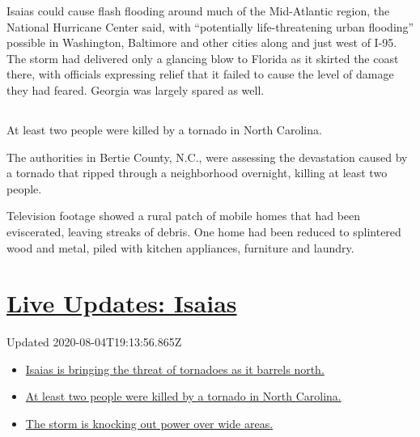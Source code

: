 Isaias could cause flash flooding around much of the Mid-Atlantic
region, the National Hurricane Center said, with ``potentially
life-threatening urban flooding'' possible in Washington, Baltimore and
other cities along and just west of I-95. The storm had delivered only a
glancing blow to Florida as it skirted the coast there, with officials
expressing relief that it failed to cause the level of damage they had
feared. Georgia was largely spared as well.

\hypertarget{-1}{%
\subsection{}\label{-1}}

At least two people were killed by a tornado in North Carolina.

The authorities in Bertie County, N.C., were assessing the devastation
caused by a tornado that ripped through a neighborhood overnight,
killing at least two people.

Television footage showed a rural patch of mobile homes that had been
eviscerated, leaving streaks of debris. One home had been reduced to
splintered wood and metal, piled with kitchen appliances, furniture and
laundry.

\hypertarget{live-updates-isaias}{%
\section{\texorpdfstring{\href{https://www.nytimes3xbfgragh.onion/2020/08/04/us/isaias-storm-updates.html?action=click\&pgtype=Article\&state=default\&region=MAIN_CONTENT_1\&context=storylines_live_updates}{Live
Updates: Isaias}}{Live Updates: Isaias}}\label{live-updates-isaias}}

Updated 2020-08-04T19:13:56.865Z

\begin{itemize}
\tightlist
\item
  \href{https://www.nytimes3xbfgragh.onion/2020/08/04/us/isaias-storm-updates.html?action=click\&pgtype=Article\&state=default\&region=MAIN_CONTENT_1\&context=storylines_live_updates\#link-362830dd}{Isaias
  is bringing the threat of tornadoes as it barrels north.}
\item
  \href{https://www.nytimes3xbfgragh.onion/2020/08/04/us/isaias-storm-updates.html?action=click\&pgtype=Article\&state=default\&region=MAIN_CONTENT_1\&context=storylines_live_updates\#link-7961bdbc}{At
  least two people were killed by a tornado in North Carolina.}
\item
  \href{https://www.nytimes3xbfgragh.onion/2020/08/04/us/isaias-storm-updates.html?action=click\&pgtype=Article\&state=default\&region=MAIN_CONTENT_1\&context=storylines_live_updates\#link-34e5d4e4}{The
  storm is knocking out power over wide areas.}
\end{itemize}

